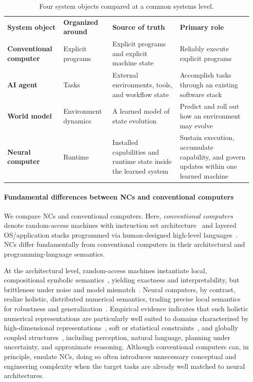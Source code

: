 \begin{table}[h]
  \centering
  \small
  \caption{Four system objects compared at a common systems level.}
  \label{tab:system-objects}
  \setlength{\tabcolsep}{5pt}
  \renewcommand{\arraystretch}{1.08}
  \begin{tabularx}{\linewidth}{l X X X}
    \toprule
    \rowcolor{tablewarmhead}
    \textbf{System object} & \textbf{Organized around} & \textbf{Source of truth} & \textbf{Primary role} \\
    \textbf{Conventional computer} & Explicit programs & Explicit programs and explicit machine state & Reliably execute explicit programs \\
    \textbf{AI agent} & Tasks & External environments, tools, and workflow state & Accomplish tasks through an existing software stack \\
    \textbf{World model} & Environment dynamics & A learned model of state evolution & Predict and roll out how an environment may evolve \\
    \textbf{Neural computer} & Runtime & Installed capabilities and runtime state inside the learned system & Sustain execution, accumulate capability, and govern updates within one learned machine \\
    \bottomrule
  \end{tabularx}
\end{table}

\paragraph{Fundamental differences between NCs and conventional computers}
We compare NCs and conventional computers.
Here, \emph{conventional computers} denote random-access machines with instruction set architecture~\citep{hartmanis1974power,anagnostopoulos1973computer} and layered OS/application stacks programmed via human-designed high-level languages~\citep{backus1957fortran,backus1963revised}.
NCs differ fundamentally from conventional computers in their architectural and programming-language semantics.

At the architectural level, random-access machines instantiate local, compositional symbolic semantics~\citep{Newell1976}, yielding exactness and interpretability, but brittleness under noise and model mismatch~\citep{BROOKS1991139}. 
Neural computers, by contrast, realize holistic, distributed numerical semantics, trading precise local semantics for robustness and generalization~\citep{ivakhnenko1965,ivakhnenko1967,ivakhnenko1968,ivakhnenko1971,Hinton1986,Bishop2006}. 
Empirical evidence indicates that such holistic numerical representations are particularly well suited to domains characterized by high-dimensional representations~\citep{bengio2013representation}, soft or statistical constraints~\citep{Smolensky1988-SMOOTP-2}, and globally coupled structures~\citep{silver2017mastering,vaswani2017attention}, including perception, natural language, planning under uncertainty, and approximate reasoning.
Although conventional computers can, in principle, emulate NCs, doing so often introduces unnecessary conceptual and engineering complexity when the target tasks are already well matched to neural architectures.

